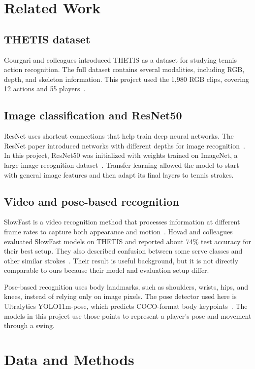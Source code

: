 \documentclass[12pt,a4paper]{article}
\begin{document}
\clearpage
\section{Related Work}
\subsection{THETIS dataset}
Gourgari and colleagues introduced THETIS as a dataset for studying tennis action recognition. The full dataset contains several modalities, including RGB, depth, and skeleton information. This project used the 1,980 RGB clips, covering 12 actions and 55 players~\cite{gourgari2013thetis}.

\subsection{Image classification and ResNet50}
ResNet uses shortcut connections that help train deep neural networks. The ResNet paper introduced networks with different depths for image recognition~\cite{he2016deep}. In this project, ResNet50 was initialized with weights trained on ImageNet, a large image recognition dataset~\cite{russakovsky2015imagenet}. Transfer learning allowed the model to start with general image features and then adapt its final layers to tennis strokes.

\subsection{Video and pose-based recognition}
SlowFast is a video recognition method that processes information at different frame rates to capture both appearance and motion~\cite{feichtenhofer2019slowfast}. Hovad and colleagues evaluated SlowFast models on THETIS and reported about 74\% test accuracy for their best setup. They also described confusion between some serve classes and other similar strokes~\cite{hovad2024classification}. Their result is useful background, but it is not directly comparable to ours because their model and evaluation setup differ.

Pose-based recognition uses body landmarks, such as shoulders, wrists, hips, and knees, instead of relying only on image pixels. The pose detector used here is Ultralytics YOLO11m-pose, which predicts COCO-format body keypoints~\cite{jocher2024yolo11,lin2014microsoft}. The models in this project use those points to represent a player's pose and movement through a swing.

\clearpage
\section{Data and Methods}
\end{document}
